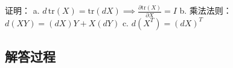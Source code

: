 \begin{example}[矩阵微分等式]
    证明：  
    a. \( d\,\text{tr}(X) = \text{tr}(dX) \implies \frac{\partial \text{tr}(X)}{\partial X} = I \)  
    b. 乘法法则：\( d(XY) = (dX)Y + X(dY) \)  
    c. \( d(X^T) = (dX)^T \)
    \end{example}
    
    \subsection*{解答过程}
    